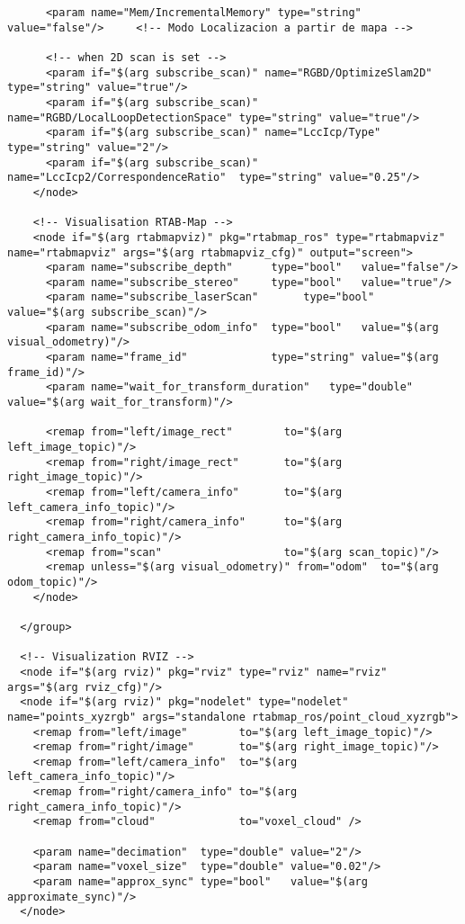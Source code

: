 \begin{center}
\begin{footnotesize}
\begin{verbatim}
      <param name="Mem/IncrementalMemory" type="string" value="false"/>     <!-- Modo Localizacion a partir de mapa -->
      
      <!-- when 2D scan is set -->
      <param if="$(arg subscribe_scan)" name="RGBD/OptimizeSlam2D"          type="string" value="true"/>
      <param if="$(arg subscribe_scan)" name="RGBD/LocalLoopDetectionSpace" type="string" value="true"/>
      <param if="$(arg subscribe_scan)" name="LccIcp/Type"                  type="string" value="2"/> 
	  <param if="$(arg subscribe_scan)" name="LccIcp2/CorrespondenceRatio"  type="string" value="0.25"/>
    </node>
  
    <!-- Visualisation RTAB-Map -->
    <node if="$(arg rtabmapviz)" pkg="rtabmap_ros" type="rtabmapviz" name="rtabmapviz" args="$(arg rtabmapviz_cfg)" output="screen">
      <param name="subscribe_depth"      type="bool"   value="false"/>
      <param name="subscribe_stereo"     type="bool"   value="true"/>
      <param name="subscribe_laserScan"       type="bool"   value="$(arg subscribe_scan)"/>
      <param name="subscribe_odom_info"  type="bool"   value="$(arg visual_odometry)"/>
      <param name="frame_id"             type="string" value="$(arg frame_id)"/>
      <param name="wait_for_transform_duration"   type="double"   value="$(arg wait_for_transform)"/>
    
      <remap from="left/image_rect"        to="$(arg left_image_topic)"/>
      <remap from="right/image_rect"       to="$(arg right_image_topic)"/>
      <remap from="left/camera_info"       to="$(arg left_camera_info_topic)"/>
      <remap from="right/camera_info"      to="$(arg right_camera_info_topic)"/>
      <remap from="scan"                   to="$(arg scan_topic)"/>
      <remap unless="$(arg visual_odometry)" from="odom"  to="$(arg odom_topic)"/>
    </node>
  
  </group>
  
  <!-- Visualization RVIZ -->
  <node if="$(arg rviz)" pkg="rviz" type="rviz" name="rviz" args="$(arg rviz_cfg)"/>
  <node if="$(arg rviz)" pkg="nodelet" type="nodelet" name="points_xyzrgb" args="standalone rtabmap_ros/point_cloud_xyzrgb">
    <remap from="left/image"        to="$(arg left_image_topic)"/>
    <remap from="right/image"       to="$(arg right_image_topic)"/>
    <remap from="left/camera_info"  to="$(arg left_camera_info_topic)"/>
    <remap from="right/camera_info" to="$(arg right_camera_info_topic)"/>
    <remap from="cloud"             to="voxel_cloud" />

    <param name="decimation"  type="double" value="2"/>
    <param name="voxel_size"  type="double" value="0.02"/>
    <param name="approx_sync" type="bool"   value="$(arg approximate_sync)"/>
  </node>


\end{verbatim}
\end{footnotesize}
\end{center}
